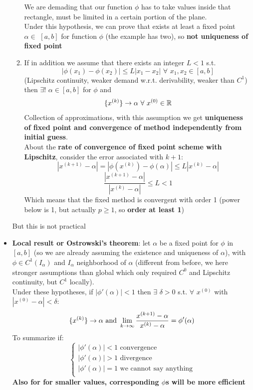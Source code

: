 \begin{itemize}
\begin{enumerate}
        We are demading that our function $\phi$ has to take values inside that rectangle, must be limited in a certain portion of the plane.\\
        Under this hypothesis, we can prove that exists at least a fixed point $\alpha\in\,\,[a,b]$ for function $\phi$ (the example has two), so \textbf{not uniqueness of fixed point}
        \item If in addition we assume that there exists an integer $L<1$ s.t.
        $$\left|\phi(x_1)-\phi(x_2)\right|\leq L|x_1-x_2|\,\,\forall\,\,x_1,x_2\in[a,b]$$
        (Lipschitz continuity, weaker demand w.r.t. derivability, weaker than $C^1$) then $\exists!\,\,\alpha\in[a,b]$ for $\phi$ and
        $$\{{x^{(k)}}\}\rightarrow\alpha\,\,\forall\,\,x^{(0)}\in\mathbb{R}$$
        Collection of approximations, with this assumption we get \textbf{uniqueness of fixed point and convergence of method independently from initial guess}.\\
        About the \textbf{rate of convergence of fixed point scheme with Lipschitz}, consider the error associated with $k+1$:
        $$|x^{(k+1)}-\alpha|=|\phi(x^{(k)})-\phi(\alpha)|\leq L|x^{(k)}-\alpha|$$
        $$\frac{|x^{(k+1)}-\alpha|}{|x^{(k)}-\alpha|}\leq L < 1$$
        Which means that the fixed method is convergent with order 1 (power below is 1, but actually $p\geq 1$, so \textbf{order at least 1})
    \end{enumerate}
    But this is not practical
    \item \textbf{Local result or Ostrowski's theorem}: let $\alpha$ be a fixed point for $\phi$ in $[a,b]$ (so we are already assuming the existence and uniqueness of $\alpha$), with $\phi\in C^1(I_\alpha)$ and $I_\alpha$ neighborhood of $\alpha$ (different from before, we here stronger assumptions than global which only required $C^0$ and Lipschitz continuity, but $C^1$ locally).\\
    Under these hypotheses, if $|\phi'(\alpha)|<1$ then $\exists\,\,\delta>0$ s.t. $\forall\,\,x^{(0)}$ with $|x^{(0)}-\alpha|<\delta$:
    $$\{{x^{(k)}}\}\rightarrow\alpha \text{ and }\lim_{k\rightarrow\infty}\frac{x^{(k+1)}-\alpha}{x^{(k)}-\alpha}=\phi'(\alpha)$$
    To summarize if:
    $$
    \begin{cases}
        |\phi'(\alpha)| < 1 \text{ convergence}\\
        |\phi'(\alpha)| > 1 \text{ divergence}\\
        |\phi'(\alpha)| = 1 \text{ we cannot say anything}\\
    \end{cases}
    $$
    \textbf{Also for for smaller values, corresponding $\phi$s will be more efficient}
\end{itemize}

